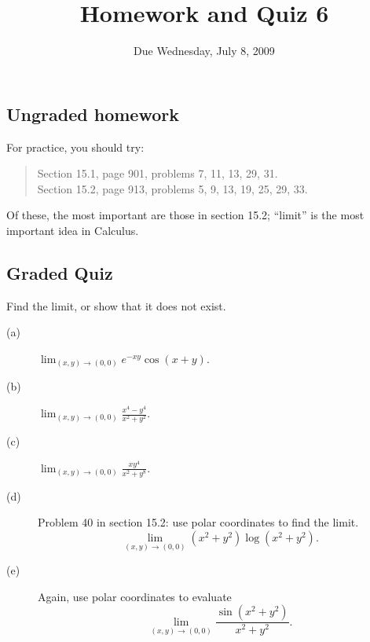 \documentclass[12pt]{article}
\title{Homework and Quiz 6}
\date{Due Wednesday, July 8, 2009}
\begin{document}
\maketitle

\subsection*{Ungraded homework}

For practice, you should try:
\begin{quote}
Section 15.1, page 901, problems 7, 11, 13, 29, 31.\\
Section 15.2, page 913, problems 5, 9, 13, 19, 25, 29, 33.
\end{quote}
Of these, the most important are those in section 15.2; ``limit'' is
the most important idea in Calculus.

\vfill

\subsection*{Graded Quiz}

Find the limit, or show that it does not exist.
\begin{description}
\item[(a)] $\displaystyle\lim_{(x,y) \to (0,0)} e^{-xy} \cos(x + y)$.
\vfill
\item[(b)] $\displaystyle\lim_{(x,y) \to (0,0)} \displaystyle\frac{x^4 - y^4}{x^2+y^2}$.
\vfill
\item[(c)] $\displaystyle\lim_{(x,y) \to (0,0)} \displaystyle\frac{xy^4}{x^2 + y^8}$.
\vfill
\item[(d)] Problem 40 in section 15.2: use polar coordinates to find the limit.
$$
\lim_{(x,y) \to (0,0)} (x^2 + y^2) \log (x^2 + y^2).
$$
\vfill
\item[(e)] Again, use polar coordinates to evaluate
$$
\lim_{(x,y) \to (0,0)} \frac{\sin (x^2 + y^2)}{x^2 + y^2}.
$$
\vfill
\end{description}
\end{document}
